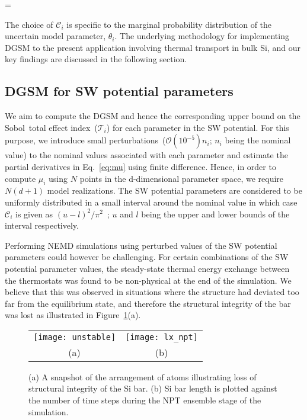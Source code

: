 \be
{} =  
\ee

\noindent The choice of $\mathcal{C}_i$ is specific to the marginal probability distribution of the uncertain model
parameter, $\theta_i$. 
The underlying methodology for implementing DGSM to the present application involving thermal transport in bulk Si,
and our key findings are discussed in the following section. 

\subsection{DGSM for SW potential parameters}
\label{sub:dgsm} 

We aim to compute the DGSM and hence the corresponding upper bound on the
Sobol\textquotesingle~total effect index~($\mathcal{T}_i$) for each parameter in the SW potential. For this purpose, we 
introduce small perturbations~($\mathcal{O}(10^{-5})n_i$; $n_i$ being the nominal value) to the nominal values
associated with each parameter and estimate the partial derivatives in Eq.~\ref{eq:mu} using finite difference. 
Hence, in order to compute $\mu_i$ using $N$ points in the d-dimensional parameter space, we require $N(d+1)$
model realizations. The SW potential parameters are considered to be uniformly distributed in a small interval
around the nominal value in which case $\mathcal{C}_i$ is given as $(u-l)^{2}/\pi^2$~\cite{Roustant:2014}; $u$
and $l$ being the upper and lower bounds of the interval respectively.   

Performing NEMD simulations using perturbed values of the SW potential parameters could however be challenging.
For certain combinations of the SW potential parameter values, the steady-state thermal
energy exchange between the thermostats was found to be non-physical at the end of the simulation. We believe that
this was observed in situations 
where the structure had deviated too far from the equilibrium state, and therefore the
structural integrity of the bar was lost as illustrated in Figure~\ref{fig:dgsm1}(a). 

\begin{figure}[htbp]
\begin{center}
\begin{tabular}{cc}
  \texttt{[image: unstable]}
  &
  \hspace{3mm}
  \texttt{[image: lx\_npt]}
  \\ (a) & (b)
  \end{tabular}
\caption{(a) A snapshot of the arrangement of atoms illustrating loss of
structural integrity of the Si bar. 
(b) Si bar length is plotted against the number of time steps during
the NPT ensemble stage of the simulation.}
\label{fig:dgsm1}
\end{center}
\end{figure}


